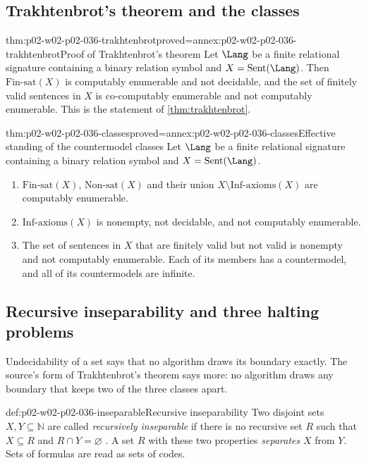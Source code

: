 \subsection{Trakhtenbrot's theorem and the classes}
\label{sec:p02-w02-p02-036-conclusions}

\begin{hbcorollary}{thm:p02-w02-p02-036-trakhtenbrot}{proved=annex:p02-w02-p02-036-trakhtenbrot}{Proof of Trakhtenbrot's theorem}
Let \(\Lang\) be a finite relational signature containing a binary relation
symbol and \(X=\operatorname{Sent}(\Lang)\).  Then
\(\mathrm{Fin\text{-}sat}(X)\) is computably enumerable and not decidable, and
the set of finitely valid sentences in \(X\) is co-computably enumerable and
not computably enumerable.  This is the statement of
\cref{thm:trakhtenbrot}.
\end{hbcorollary}

\begin{hbtheorem}{thm:p02-w02-p02-036-classes}{proved=annex:p02-w02-p02-036-classes}{Effective standing of the countermodel classes}
Let \(\Lang\) be a finite relational signature containing a binary relation
symbol and \(X=\operatorname{Sent}(\Lang)\).
\begin{enumerate}
\item \(\mathrm{Fin\text{-}sat}(X)\), \(\mathrm{Non\text{-}sat}(X)\) and their
      union \(X\setminus\mathrm{Inf\text{-}axioms}(X)\) are computably
      enumerable.
\item \(\mathrm{Inf\text{-}axioms}(X)\) is nonempty, not decidable, and not
      computably enumerable.
\item The set of sentences in \(X\) that are finitely valid but not valid is
      nonempty and not computably enumerable.  Each of its members has a
      countermodel, and all of its countermodels are infinite.
\end{enumerate}
\end{hbtheorem}

\subsection{Recursive inseparability and three halting problems}
\label{sec:p02-w02-p02-036-inseparability}

Undecidability of a set says that no algorithm draws its boundary exactly.
The source's form of Trakhtenbrot's theorem says more: no algorithm draws
any boundary that keeps two of the three classes apart.

\begin{hbdefinition}{def:p02-w02-p02-036-inseparable}{Recursive inseparability}
Two disjoint sets \(X,Y\subseteq\mathbb N\) are called \emph{recursively
inseparable} if there is no recursive set \(R\) such that \(X\subseteq R\) and
\(R\cap Y=\varnothing\) \cite[Sect.~2.1.2, Def.~2.1.28]{BorgerGradelGurevich1997}.
A set \(R\) with these two properties \emph{separates} \(X\) from \(Y\).
Sets of formulas are read as sets of codes.
\end{hbdefinition}

